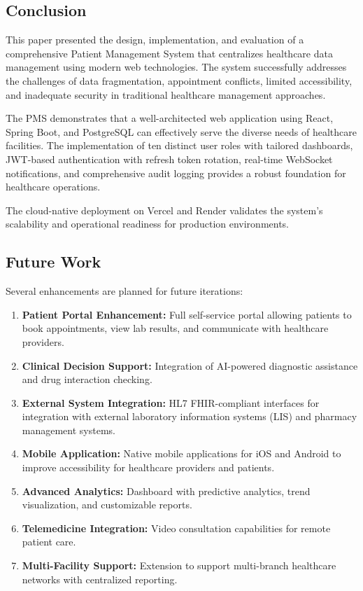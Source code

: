\documentclass[conference]{IEEEtran}
\begin{document}
\subsection{Conclusion}
This paper presented the design, implementation, and evaluation of a comprehensive Patient Management System that centralizes healthcare data management using modern web technologies. The system successfully addresses the challenges of data fragmentation, appointment conflicts, limited accessibility, and inadequate security in traditional healthcare management approaches.

The PMS demonstrates that a well-architected web application using React, Spring Boot, and PostgreSQL can effectively serve the diverse needs of healthcare facilities. The implementation of ten distinct user roles with tailored dashboards, JWT-based authentication with refresh token rotation, real-time WebSocket notifications, and comprehensive audit logging provides a robust foundation for healthcare operations.

The cloud-native deployment on Vercel and Render validates the system's scalability and operational readiness for production environments.

\subsection{Future Work}
Several enhancements are planned for future iterations:
\begin{enumerate}[leftmargin=*]
  \item \textbf{Patient Portal Enhancement:} Full self-service portal allowing patients to book appointments, view lab results, and communicate with healthcare providers.
  \item \textbf{Clinical Decision Support:} Integration of AI-powered diagnostic assistance and drug interaction checking.
  \item \textbf{External System Integration:} HL7 FHIR-compliant interfaces for integration with external laboratory information systems (LIS) and pharmacy management systems.
  \item \textbf{Mobile Application:} Native mobile applications for iOS and Android to improve accessibility for healthcare providers and patients.
  \item \textbf{Advanced Analytics:} Dashboard with predictive analytics, trend visualization, and customizable reports.
  \item \textbf{Telemedicine Integration:} Video consultation capabilities for remote patient care.
  \item \textbf{Multi-Facility Support:} Extension to support multi-branch healthcare networks with centralized reporting.
\end{enumerate}
\end{document}
